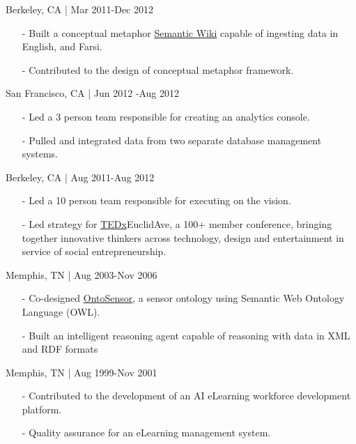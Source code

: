 \documentclass[11pt,article,oneside]{memoir}
\begin{document}
 \hfill Berkeley, CA | Mar 2011-Dec 2012
\begin{itemize}[nolistsep]
\item[-] Built a conceptual metaphor \href{http://metaphor.icsi.berkeley.edu}{Semantic Wiki} capable of ingesting data in English, and Farsi.
\item[-] Contributed to the design of conceptual metaphor framework.
\end{itemize} 

 \hfill San Francisco, CA | Jun 2012 -Aug 2012
\begin{itemize}[nolistsep]
\item[-]Led a 3 person team responsible for creating an analytics console.
\item[-]Pulled and integrated data from two separate database management systems.
\end{itemize} 

 \hfill Berkeley, CA | Aug 2011-Aug 2012
\begin{itemize}[noitemsep,nolistsep]
\item[-]Led a 10 person team responsible for executing on the vision.
\item[-]Led strategy for \href{http://www.ted.com/tedx/events/3790}{TEDx}EuclidAve, a 100+ member conference, bringing together innovative thinkers across technology, design and entertainment in service of social entrepreneurship.
\end{itemize}

 \hfill Memphis, TN | Aug 2003-Nov 2006
\begin{itemize}[nolistsep]
\item[-]Co-designed \href{https://scholar.google.com/scholar?hl=en&q=Building+a+Sensor+Ontology\%3A+A+Practical+Approach+Leveraging+ISO+and+OGC+Models.&btnG=&as_sdt=1\%2C43&as_sdtp=}{OntoSensor}, a sensor ontology using Semantic Web Ontology Language (OWL).
\item[-]Built an intelligent reasoning agent capable of reasoning with data in XML and RDF formats
\end{itemize}

 \hfill Memphis, TN | Aug 1999-Nov 2001
\begin{itemize}[nolistsep]
\item[-]Contributed to the development of an AI eLearning workforce development platform.
\item[-]Quality assurance for an eLearning management system.
\end{itemize} 
\end{document}
